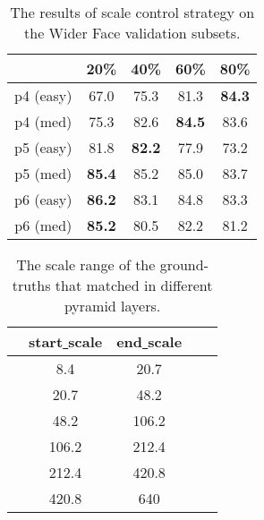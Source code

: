 \documentclass[10pt,twocolumn,letterpaper]{article}
\begin{document}
\begin{table}[h]
\small
\renewcommand\arraystretch{1.1}
	\begin{center}
	\setlength{\tabcolsep}{10pt}
	\begin{tabular}{c|cccc}
		\hline
		   & 20\%  & 40\% & 60\% & 80\% \\
		\hline
        p4 (easy) &67.0 &75.3 &81.3 & \textbf{84.3} \\
        p4 (med) &75.3 &82.6 &\textbf{84.5} & 83.6 \\
        p5 (easy) &81.8 &\textbf{82.2} &77.9 & 73.2 \\
        p5 (med) &\textbf{85.4} &85.2 &85.0 & 83.7 \\
        p6 (easy) &\textbf{86.2} &83.1 &84.8 & 83.3 \\
        p6 (med) & \textbf{85.2} & 80.5 & 82.2 & 81.2 \\
		\hline				
	\end{tabular}
	\end{center}
\vspace{-10pt}
\caption{The results of scale control strategy on the Wider Face validation subsets.
}
\label{table_0}
\end{table}

\begin{table}[h]
\small
\renewcommand\arraystretch{1.1}
	\begin{center}
	\setlength{\tabcolsep}{20pt}
	\begin{tabular}{c|cccc}
		\hline
		   & start\underline{ }scale & end\underline{ }scale \\
		\hline
	     & 8.4 & 20.7 \\
	     & 20.7 & 48.2 \\
	     & 48.2 & 106.2 \\
	     & 106.2 & 212.4 \\
	     & 212.4 & 420.8 \\
	     & 420.8 & 640 \\
		\hline				
	\end{tabular}
	\end{center}
\vspace{-10pt}
\caption{The scale range of the ground-truths that matched in different pyramid layers. 
}
\label{table_4}
\end{table}
\end{document}
